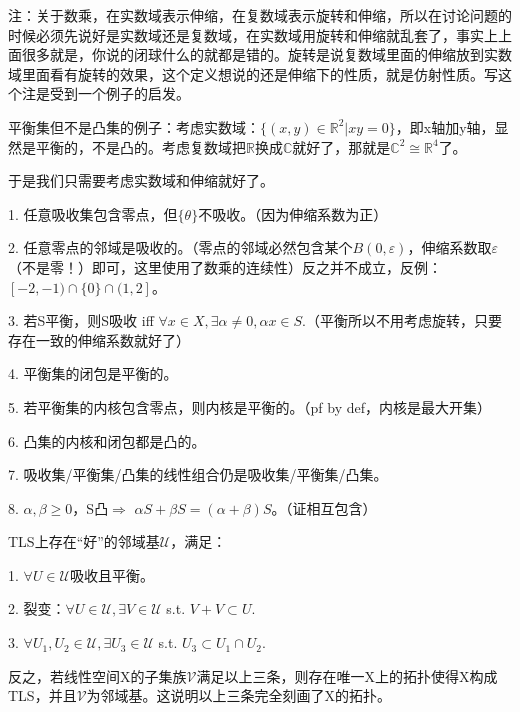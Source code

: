 注：关于数乘，在实数域表示伸缩，在复数域表示旋转和伸缩，所以在讨论问题的时候必须先说好是实数域还是复数域，在实数域用旋转和伸缩就乱套了，事实上上面很多就是，你说的闭球什么的就都是错的。旋转是说复数域里面的伸缩放到实数域里面看有旋转的效果，这个定义想说的还是伸缩下的性质，就是仿射性质。写这个注是受到一个例子的启发。

平衡集但不是凸集的例子：考虑实数域：$\{(x, y) \in \mathbb{R}^2 | xy = 0\}$，即x轴加y轴，显然是平衡的，不是凸的。考虑复数域把$\mathbb{R}$换成$\mathbb{C}$就好了，那就是$\mathbb{C}^2 \cong \mathbb{R}^4$了。

于是我们只需要考虑实数域和伸缩就好了。

\begin{prop}
  1. 任意吸收集包含零点，但$\{ \theta \}$不吸收。（因为伸缩系数为正）

  2. 任意零点的邻域是吸收的。（零点的邻域必然包含某个$B(0, \varepsilon)$，伸缩系数取$\varepsilon$（不是零！）即可，这里使用了数乘的连续性）反之并不成立，反例：$[-2, -1) \cap \{0\} \cap (1, 2]$。

  3. 若S平衡，则S吸收 iff $\forall x \in X, \exists \alpha \neq 0, \alpha x \in S$.（平衡所以不用考虑旋转，只要存在一致的伸缩系数就好了）

  4. 平衡集的闭包是平衡的。

  5. 若平衡集的内核包含零点，则内核是平衡的。（pf by def，内核是最大开集）

  6. 凸集的内核和闭包都是凸的。

  7. 吸收集/平衡集/凸集的线性组合仍是吸收集/平衡集/凸集。

  8. $\alpha, \beta \ge 0$，S凸$\Rightarrow$ $\alpha S + \beta S = (\alpha + \beta)S$。（证相互包含）
\end{prop}

\begin{thm}
  TLS上存在“好”的邻域基$\mathcal{U}$，满足：

  1. $\forall U \in \mathcal{U}$吸收且平衡。

  2. 裂变：$\forall U \in \mathcal{U}, \exists V 
  \in \mathcal{U}$ s.t. $V + V \subset U$.

  3. $\forall U_1, U_2 \in \mathcal{U}, \exists U_3 \in \mathcal{U}$ s.t. $U_3 \subset U_1 \cap U_2$.
  
  反之，若线性空间X的子集族$\mathcal{V}$满足以上三条，则存在唯一X上的拓扑使得X构成TLS，并且$\mathcal{V}$为邻域基。这说明以上三条完全刻画了X的拓扑。
\end{thm}

